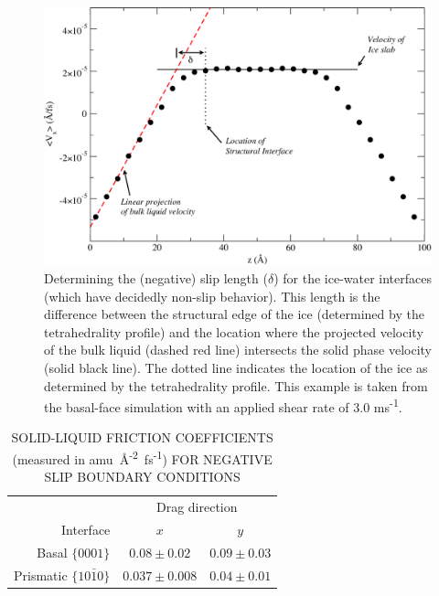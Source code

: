 \begin{figure}
\includegraphics[width=\linewidth]{Figures/delta_example}
\caption{\label{fig:delta_example} Determining the (negative) slip
  length ($\delta$) for the ice-water interfaces (which have decidedly
  non-slip behavior).  This length is the difference between the
  structural edge of the ice (determined by the tetrahedrality
  profile) and the location where the projected velocity of the bulk
  liquid (dashed red line) intersects the solid phase velocity (solid
  black line).  The dotted line indicates the location of the ice as
  determined by the tetrahedrality profile.  This example is taken
  from the basal-face simulation with an applied shear rate of 3.0 ms\textsuperscript{-1}.}
\end{figure}

\begin{table}[h]
\centering
\caption{SOLID-LIQUID FRICTION COEFFICIENTS (measured in
  amu~\AA\textsuperscript{-2}~fs\textsuperscript{-1}) FOR NEGATIVE
  SLIP BOUNDARY CONDITIONS }
\label{tab:lambda}
\begin{tabular}{|r|cc|}  \hline
           & \multicolumn{2}{c|}{Drag direction} \\ 
 Interface & $x$               & $y$  \\ \hline
     Basal  $\{0001\}$ &  $0.08 \pm 0.02$  & $0.09 \pm 0.03$ \\
 Prismatic  $\{10\bar{1}0\}$ & $0.037 \pm 0.008$ & $0.04 \pm 0.01$ \\ \hline
\end{tabular}
\end{table}




